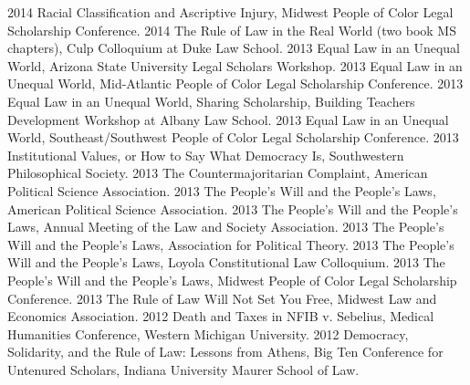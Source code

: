 \documentclass[letterpaper]{moderncv}
\begin{document}
\cvitem
{2014}
{Racial Classification and Ascriptive Injury, Midwest People of Color Legal Scholarship Conference.}
\vspace{1mm}
\cvitem
{2014}
{The Rule of Law in the Real World (two book MS chapters), Culp Colloquium at Duke Law School.}
\vspace{1mm}
\cvitem
{2013}
{Equal Law in an Unequal World, Arizona State University Legal Scholars Workshop.}
\vspace{1mm}
\cvitem
{2013}
{Equal Law in an Unequal World, Mid-Atlantic People of Color Legal Scholarship Conference.}
\vspace{1mm}
\cvitem
{2013}
{Equal Law in an Unequal World, Sharing Scholarship, Building Teachers Development Workshop at Albany Law School.}
\vspace{1mm}
\cvitem
{2013}
{Equal Law in an Unequal World, Southeast/Southwest People of Color Legal Scholarship Conference.}
\vspace{1mm}
\cvitem
{2013}
{Institutional Values, or How to Say What Democracy Is, Southwestern Philosophical Society.}
\vspace{1mm}
\cvitem
{2013}
{The Countermajoritarian Complaint, American Political Science Association.}
\vspace{1mm}
\cvitem
{2013}
{The People's Will and the People's Laws, American Political Science Association.}
\vspace{1mm}
\cvitem
{2013}
{The People's Will and the People's Laws, Annual Meeting of the Law and Society Association.}
\vspace{1mm}
\cvitem
{2013}
{The People's Will and the People's Laws, Association for Political Theory.}
\vspace{1mm}
\cvitem
{2013}
{The People's Will and the People's Laws, Loyola Constitutional Law Colloquium.}
\vspace{1mm}
\cvitem
{2013}
{The People's Will and the People's Laws, Midwest People of Color Legal Scholarship Conference.}
\vspace{1mm}
\cvitem
{2013}
{The Rule of Law Will Not Set You Free, Midwest Law and Economics Association.}
\vspace{1mm}
\cvitem
{2012}
{Death and Taxes in NFIB v. Sebelius, Medical Humanities Conference, Western Michigan University.}
\vspace{1mm}
\cvitem
{2012}
{Democracy, Solidarity, and the Rule of Law: Lessons from Athens, Big Ten Conference for Untenured Scholars, Indiana University Maurer School of Law.}
\vspace{1mm}
\end{document}
